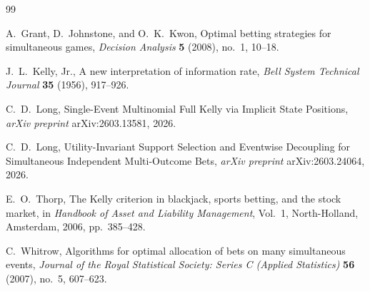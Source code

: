\documentclass[11pt]{article}
\numberwithin{equation}{section}
\theoremstyle{remark}
\theoremstyle{definition}
\newcommand{\1}{\mathbf{1}}
\begin{document}
\begin{thebibliography}{99}

A.~Grant, D.~Johnstone, and O.~K.~Kwon,
\newblock Optimal betting strategies for simultaneous games,
\newblock \emph{Decision Analysis} \textbf{5} (2008), no.~1, 10--18.

J.~L.~Kelly, Jr.,
\newblock A new interpretation of information rate,
\newblock \emph{Bell System Technical Journal} \textbf{35} (1956), 917--926.

C.~D.~Long,
\newblock Single-Event Multinomial Full Kelly via Implicit State Positions,
\newblock \emph{arXiv preprint} arXiv:2603.13581, 2026.

C.~D.~Long,
\newblock Utility-Invariant Support Selection and Eventwise Decoupling for Simultaneous Independent Multi-Outcome Bets,
\newblock \emph{arXiv preprint} arXiv:2603.24064, 2026.

E.~O.~Thorp,
\newblock The Kelly criterion in blackjack, sports betting, and the stock market,
\newblock in \emph{Handbook of Asset and Liability Management}, Vol.~1, North-Holland, Amsterdam, 2006, pp.~385--428.

C.~Whitrow,
\newblock Algorithms for optimal allocation of bets on many simultaneous events,
\newblock \emph{Journal of the Royal Statistical Society: Series C (Applied Statistics)} \textbf{56} (2007), no.~5, 607--623.

\end{thebibliography}
\end{document}
